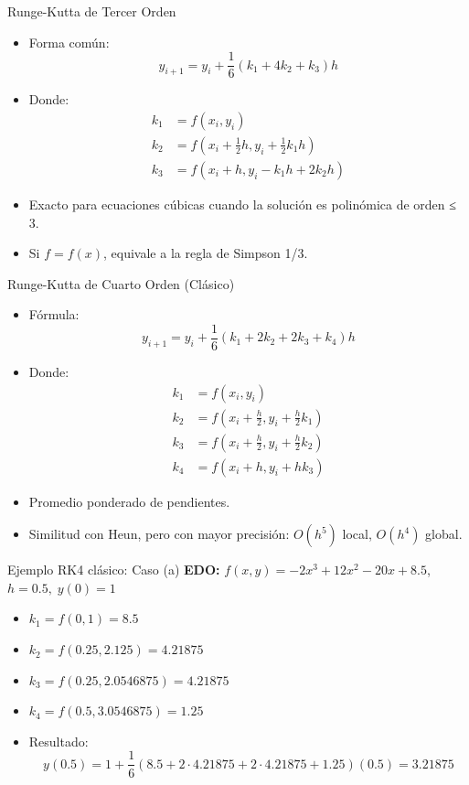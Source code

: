 \documentclass[main.tex]{subfiles}
\begin{document}
\begin{frame}{\small Runge-Kutta de Tercer Orden}
\begin{itemize}
  \item Forma común:
  \[
    y_{i+1} = y_i + \frac{1}{6}(k_1 + 4k_2 + k_3) h
  \]
  \item Donde:
  \begin{align*}
    k_1 &= f(x_i, y_i) \\
    k_2 &= f\left(x_i + \frac{1}{2}h, y_i + \frac{1}{2}k_1 h\right) \\
    k_3 &= f(x_i + h, y_i - k_1 h + 2 k_2 h)
  \end{align*}
  \item Exacto para ecuaciones cúbicas cuando la solución es polinómica de orden ≤ 3.
  \item Si \( f = f(x) \), equivale a la regla de Simpson 1/3.
\end{itemize}
\end{frame}

\begin{frame}{\small Runge-Kutta de Cuarto Orden (Clásico)}
\begin{itemize}
  \item Fórmula:
  \[
    y_{i+1} = y_i + \frac{1}{6}(k_1 + 2k_2 + 2k_3 + k_4) h
  \]
  \item Donde:
  \begin{align*}
    k_1 &= f(x_i, y_i) \\
    k_2 &= f\left(x_i + \frac{h}{2}, y_i + \frac{h}{2}k_1\right) \\
    k_3 &= f\left(x_i + \frac{h}{2}, y_i + \frac{h}{2}k_2\right) \\
    k_4 &= f(x_i + h, y_i + h k_3)
  \end{align*}
  \item Promedio ponderado de pendientes.
  \item Similitud con Heun, pero con mayor precisión: \( O(h^5) \) local, \( O(h^4) \) global.
\end{itemize}
\end{frame}
\begin{frame}{\small Ejemplo RK4 clásico: Caso (a)}
\textbf{EDO:} \( f(x, y) = -2x^3 + 12x^2 - 20x + 8.5 \),\quad \( h = 0.5,\; y(0) = 1 \)
\begin{itemize}
  \item \( k_1 = f(0,1) = 8.5 \)
  \item \( k_2 = f(0.25, 2.125) = 4.21875 \)
  \item \( k_3 = f(0.25, 2.0546875) = 4.21875 \)
  \item \( k_4 = f(0.5, 3.0546875) = 1.25 \)
  \item Resultado:
  \[
    y(0.5) = 1 + \frac{1}{6}(8.5 + 2\cdot4.21875 + 2\cdot4.21875 + 1.25)(0.5) = 3.21875
  \]
\end{itemize}
\end{frame}
\end{document}

